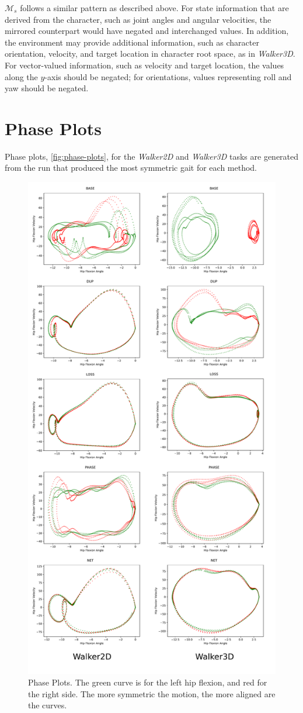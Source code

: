 $\mathcal{M}_s$ follows a similar pattern as described above.  For state information that are derived from the character, such as joint angles and angular velocities, the mirrored counterpart would have negated and interchanged values.  In addition, the environment may provide additional information, such as character orientation, velocity, and target location in character root space, as in \textit{Walker3D}.  For vector-valued information, such as velocity and target location, the values along the $y$-axis should be negated; for orientations, values representing roll and yaw should be negated.

\section{Phase Plots}
\label{sec:phase-plots}

Phase plots, \autoref{fig:phase-plots}, for the \textit{Walker2D} and \textit{Walker3D} tasks are generated from the run that produced the most symmetric gait for each method.  

\begin{figure}
  \centering
  \includegraphics[width=0.70\columnwidth]{symmetry_figures/phase_plots.pdf}
  \caption{Phase Plots.  The green curve is for the left hip flexion, and red for the right side.  The more symmetric the motion, the more aligned are the curves.}
  \label{fig:phase-plots}
\end{figure}


